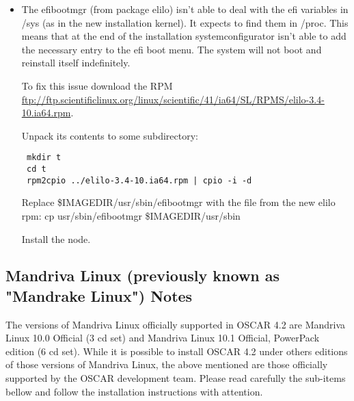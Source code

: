 \begin{itemize}

\item The efibootmgr (from package elilo) isn't able to deal with the 
efi variables in /sys (as in the new installation kernel). It expects 
to find them in /proc. This means that at the end of the installation 
systemconfigurator isn't able to add the necessary entry to the efi 
boot menu. The system will not boot and reinstall itself indefinitely.

To fix this issue download the RPM \url{ftp://ftp.scientificlinux.org/linux/scientific/41/ia64/SL/RPMS/elilo-3.4-10.ia64.rpm}.

Unpack its contents to some subdirectory:
\begin{verbatim}
 mkdir t
 cd t
 rpm2cpio ../elilo-3.4-10.ia64.rpm | cpio -i -d
\end{verbatim}
Replace \$IMAGEDIR/usr/sbin/efibootmgr with the file from the new elilo rpm:
 cp usr/sbin/efibootmgr \$IMAGEDIR/usr/sbin

Install the node.

\end{itemize}


\subsection{Mandriva Linux (previously known as "Mandrake Linux") Notes}
\label{subsec:mdk10notes}

The versions of Mandriva Linux officially supported in OSCAR 4.2 are
Mandriva Linux 10.0 Official (3 cd set) and Mandriva Linux 10.1 Official, 
PowerPack edition (6 cd set). While it is possible to install OSCAR 4.2 under 
others editions of those versions of Mandriva Linux, the above mentioned are
those officially supported by the OSCAR development team. Please read 
carefully the sub-items bellow and follow the installation instructions
with attention. 

